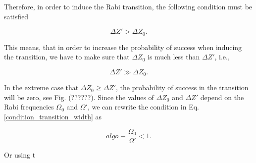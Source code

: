 \documentclass{article}
\begin{document}
Therefore, in order to induce the Rabi transition, the following condition must be satisfied

\begin{equation}\label{condition_transition_width}
    \Delta Z' > \Delta Z_{0}.
\end{equation}

This means, that in order to increase the probability of success when inducing the transition, we have to make sure that $\Delta Z_{0}$ is much less than $\Delta Z'$, i.e.,

\begin{equation}
    \Delta Z' \gg \Delta Z_{0}.
\end{equation}

In the extreme case that $\Delta Z_{0} \ge \Delta Z'$, the probability of success in the transition will be zero, see Fig. (??????). Since the values of $\Delta Z_{0}$ and $\Delta Z'$ depend on the Rabi frequencies $\Omega_{0}$ and $\Omega'$, we can rewrite the condition in Eq. \ref{condition_transition_width} as

\begin{equation}
    algo \equiv \frac{\Omega_{0}}{\Omega'} < 1.
\end{equation}

Or using t



\end{document}
